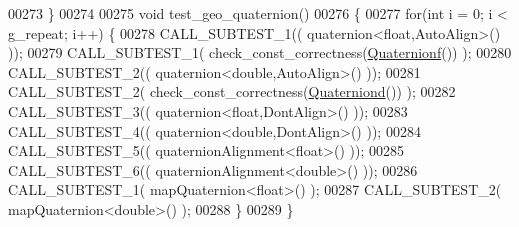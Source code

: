 \begin{DoxyCode}
00273 \}
00274 
00275 \textcolor{keywordtype}{void} test\_geo\_quaternion()
00276 \{
00277   \textcolor{keywordflow}{for}(\textcolor{keywordtype}{int} i = 0; i < g\_repeat; i++) \{
00278     CALL\_SUBTEST\_1(( quaternion<float,AutoAlign>() ));
00279     CALL\_SUBTEST\_1( check\_const\_correctness(\hyperlink{group___geometry___module_ga785b13a5a87f9bf55d4eba51ead2dcf0}{Quaternionf}()) );
00280     CALL\_SUBTEST\_2(( quaternion<double,AutoAlign>() ));
00281     CALL\_SUBTEST\_2( check\_const\_correctness(\hyperlink{group___geometry___module_ga6e77eb8b6aae0e04be2db88107dbc642}{Quaterniond}()) );
00282     CALL\_SUBTEST\_3(( quaternion<float,DontAlign>() ));
00283     CALL\_SUBTEST\_4(( quaternion<double,DontAlign>() ));
00284     CALL\_SUBTEST\_5(( quaternionAlignment<float>() ));
00285     CALL\_SUBTEST\_6(( quaternionAlignment<double>() ));
00286     CALL\_SUBTEST\_1( mapQuaternion<float>() );
00287     CALL\_SUBTEST\_2( mapQuaternion<double>() );
00288   \}
00289 \}
\end{DoxyCode}
